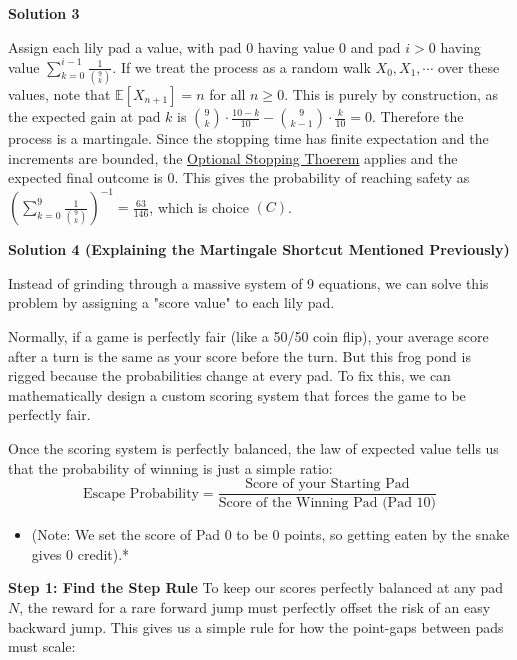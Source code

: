 \begin{enumerate}
\textbf{Solution 3}

Assign each lily pad a value, with pad $0$ having value $0$ and pad $i > 0$ having value $\sum_{k=0}^{i-1}\frac{1}{\binom{9}{k}}$. If we treat the process as a random walk $X_0, X_1, \cdots$ over these values, note that $\mathbb{E}[X_{n+1}] = n$ for all $n \ge 0$. This is purely by construction, as the expected gain at pad $k$ is $\binom{9}{k}\cdot \frac{10-k}{10} - \binom{9}{k-1}\cdot \frac{k}{10} = 0$. Therefore the process is a martingale. Since the stopping time has finite expectation and the increments are bounded, the \href{https://en.wikipedia.org/wiki/Optional\_stopping\_theorem}{Optional Stopping Thoerem} applies and the expected final outcome is $0$. This gives the probability of reaching safety as $\left(\sum_{k=0}^{9}\frac{1}{\binom{9}{k}}\right)^{-1} = \frac{63}{146}$, which is choice $\boxed{(C)}$.

 


 



\textbf{Solution 4 (Explaining the Martingale Shortcut Mentioned Previously)}

Instead of grinding through a massive system of 9 equations, we can solve this problem by assigning a "score value" to each lily pad. 

 Normally, if a game is perfectly fair (like a 50/50 coin flip), your average score after a turn is the same as your score before the turn. But this frog pond is rigged because the probabilities change at every pad. To fix this, we can mathematically design a custom scoring system that forces the game to be perfectly fair. 

 Once the scoring system is perfectly balanced, the law of expected value tells us that the probability of winning is just a simple ratio:
 \[\text{Escape Probability} = \frac{\text{Score of your Starting Pad}}{\text{Score of the Winning Pad (Pad 10)}}\]

            \begin{itemize}
        \item (Note: We set the score of Pad 0 to be 0 points, so getting eaten by the snake gives 0 credit).*
            \end{itemize}
            \textbf{Step 1: Find the Step Rule} To keep our scores perfectly balanced at any pad $N$, the reward for a rare forward jump must perfectly offset the risk of an easy backward jump. This gives us a simple rule for how the point-gaps between pads must scale:


\end{enumerate}
